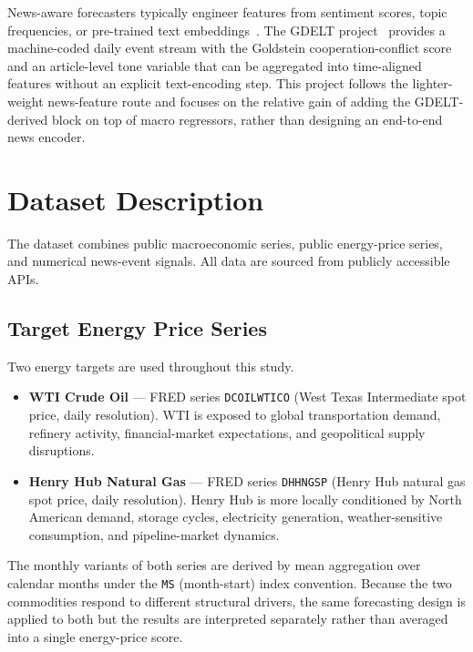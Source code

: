 \documentclass[12pt,a4paper]{article}
\begin{document}
News-aware forecasters typically engineer features from sentiment scores, topic frequencies, or pre-trained text embeddings~\citep{tetlock2007giving,baker2016measuring,shapiro2022measuring,li2014news}. The GDELT project~\citep{leetaru2013gdelt} provides a machine-coded daily event stream with the Goldstein cooperation-conflict score~\citep{goldstein1992conflict} and an article-level tone variable that can be aggregated into time-aligned features without an explicit text-encoding step. This project follows the lighter-weight news-feature route and focuses on the relative gain of adding the GDELT-derived block on top of macro regressors, rather than designing an end-to-end news encoder.

\section{Dataset Description}\label{sec:dataset}

The dataset combines public macroeconomic series, public energy-price series, and numerical news-event signals. All data are sourced from publicly accessible APIs.

\subsection{Target Energy Price Series}

Two energy targets are used throughout this study.

\begin{itemize}[leftmargin=*]
  \item \textbf{WTI Crude Oil} — FRED series \texttt{DCOILWTICO} (West Texas Intermediate spot price, daily resolution). WTI is exposed to global transportation demand, refinery activity, financial-market expectations, and geopolitical supply disruptions.
  \item \textbf{Henry Hub Natural Gas} — FRED series \texttt{DHHNGSP} (Henry Hub natural gas spot price, daily resolution). Henry Hub is more locally conditioned by North American demand, storage cycles, electricity generation, weather-sensitive consumption, and pipeline-market dynamics.
\end{itemize}

The monthly variants of both series are derived by mean aggregation over calendar months under the \texttt{MS} (month-start) index convention. Because the two commodities respond to different structural drivers, the same forecasting design is applied to both but the results are interpreted separately rather than averaged into a single energy-price score.
\end{document}
